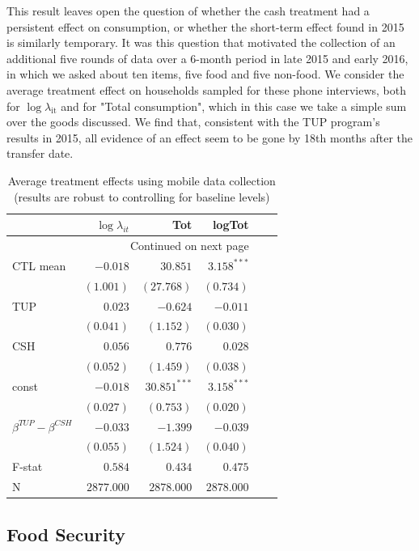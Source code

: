 \documentclass[12pt,article]{article}
\begin{document}
This result leaves open the question of whether the cash treatment had a persistent effect
on consumption, or whether the short-term effect found in 2015 is similarly
temporary. It was this question that motivated the collection of an additional five
rounds of data over a 6-month period in late 2015 and early 2016, in which
we asked about ten items, five food and five non-food. We consider the average treatment effect
on households sampled for these phone interviews, both for $\log$$\lambda$$_{\text{it}}$ and for
"Total consumption", which in this case we take a simple sum over the goods
discussed. We find that, consistent with the TUP program's results in 2015, all evidence of an effect
seem to be gone by 18th months after the transfer date.

\begin{longtable}{lrrrrr}
\caption{\label{tab:mobile_consumption}Average treatment effects using mobile data collection (results are robust to controlling for baseline levels)}
\\
\hline
 & $\log\lambda_{it}$ & Tot & logTot\\
\hline
\endhead
\hline\multicolumn{4}{r}{Continued on next page} \\
\endfoot
\endlastfoot
CTL mean & $-0.018$ & $30.851$ & $3.158^{***}$\\
 & $(1.001)$ & $(27.768)$ & $(0.734)$\\
\hline
TUP & $0.023$ & $-0.624$ & $-0.011$\\
 & $(0.041)$ & $(1.152)$ & $(0.030)$\\
CSH & $0.056$ & $0.776$ & $0.028$\\
 & $(0.052)$ & $(1.459)$ & $(0.038)$\\
const & $-0.018$ & $30.851^{***}$ & $3.158^{***}$\\
 & $(0.027)$ & $(0.753)$ & $(0.020)$\\
\hline
$\beta^{TUP}-\beta^{CSH}$ & $-0.033$ & $-1.399$ & $-0.039$\\
 & $(0.055)$ & $(1.524)$ & $(0.040)$\\
\hline
F-stat & $0.584$ & $0.434$ & $0.475$\\
N & $2877.000$ & $2878.000$ & $2878.000$\\
\hline
\end{longtable}


\subsection{Food Security}
\label{sec-3-4}
\end{document}
